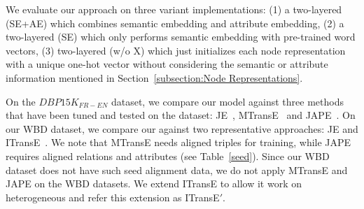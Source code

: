 
    	We evaluate our approach on three variant implementations: (1) a two-layered \HRGCN (SE+AE) which combines semantic embedding and
attribute embedding, (2) a two-layered \HRGCN (SE) which only performs semantic embedding with pre-trained word vectors, (3) two-layered
\HRGCN (w/o X) which just initializes each node representation with a unique one-hot vector without considering the semantic or attribute
information mentioned in Section~\ref{subsection:Node Representations}.

    On the $DBP15K_{FR-EN}$ dataset, we compare our \HRGCN model against three methods that have been tuned and tested on the dataset:
    JE~\cite{hao2016joint}, MTransE~\cite{chen2016multilingual} and JAPE~\cite{sun2017cross}. On our WBD dataset, we compare our \HRGCN
    against two representative approaches: JE and ITransE~\cite{zhu2017iterative}. We note that MTransE needs aligned triples for training,
    while JAPE requires aligned relations and attributes (see Table~\ref{seed}). Since our WBD dataset does not have such
    seed alignment data, we do not apply MTransE and JAPE on the WBD datasets. We extend ITransE to allow it work on heterogeneous
    \KGs and refer this extension as ITransE$'$.
%


	
%	



